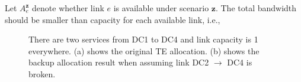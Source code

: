 \documentclass[sigconf]{acmart}
\begin{document}
Let $A_e^{ \mathbf{z}}$ denote whether link $e$ is available under scenario $ \mathbf{z}$.
The total bandwidth should be smaller than capacity for each available link, i.e.,  

\begin{figure}[t]
\centering
{}
\caption{There are two services from DC1 to DC4 and link capacity is 1 everywhere. (a) shows the original TE allocation. (b) shows the backup allocation result when assuming link DC2 $\to$ DC4 is broken.  }
\label{recovery}
\end{figure}
\end{document}
